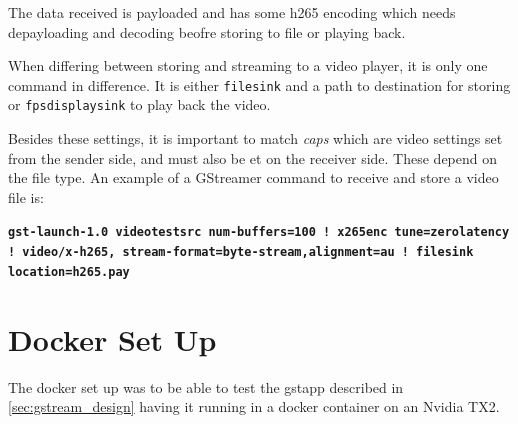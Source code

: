 The data received is payloaded and has some h265 encoding which needs depayloading and decoding beofre storing to file or playing back. 

When differing between storing and streaming to a video player, it is only one command in difference. It is either \lstinline|filesink| and a path to destination for storing or \lstinline|fpsdisplaysink| to play back the video.

Besides these settings, it is important to match \textit{caps} which are video settings set from the sender side, and must also be et on the receiver side. These depend on the file type. An example of a GStreamer command to receive and store a video file is:

\noindent\textbf{\lstinline|gst-launch-1.0 videotestsrc num-buffers=100 ! x265enc tune=zerolatency ! video/x-h265, stream-format=byte-stream,alignment=au ! filesink location=h265.pay|}

\section{Docker Set Up}
The docker set up was to be able to test the \gls{gstapp} described in \autoref{sec:gstream_design} having it running in a docker container on an Nvidia TX2.

